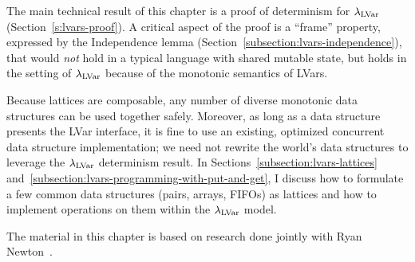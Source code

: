 The main technical result of this chapter is a proof of determinism
for $\lambda_{\textrm{LVar}}$ (Section~\ref{s:lvars-proof}).  A critical aspect of
the proof is a ``frame'' property, expressed by the Independence lemma
(Section~\ref{subsection:lvars-independence}), that would \emph{not}
hold in a typical language with shared mutable state, but holds in the
setting of $\lambda_{\textrm{LVar}}$ because of the monotonic semantics of
LVars.

Because lattices are composable, any number of diverse monotonic data
structures can be used together safely.  Moreover, as long as a data
structure presents the LVar interface, it is fine to use an existing,
optimized concurrent data structure implementation; we need not
rewrite the world's data structures to leverage the $\lambda_{\textrm{LVar}}$
determinism result. In Sections~\ref{subsection:lvars-lattices}
and~\ref{subsection:lvars-programming-with-put-and-get}, I discuss how
to formulate a few common data structures (pairs, arrays, FIFOs) as
lattices and how to implement operations on them within the
$\lambda_{\textrm{LVar}}$ model.

The material in this chapter is based on research done jointly with
Ryan Newton~\cite{LVars-paper, LVars-tr}.
